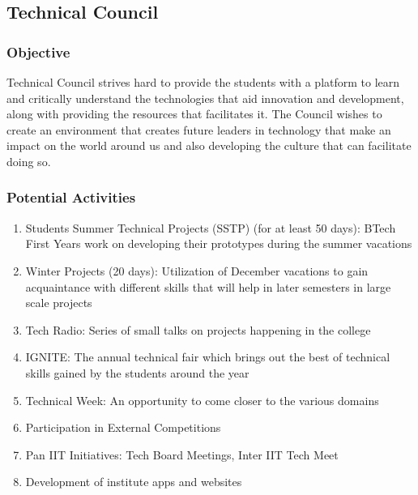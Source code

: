 \documentclass[12pt]{article}
\begin{document}
\newpage
\subsection{Technical Council}

\subsubsection{Objective}
Technical Council strives hard to provide the students with a platform to learn and critically understand the technologies that aid innovation and development, along with providing the resources that facilitates it. The Council wishes to create an environment that creates future leaders in technology that make an impact on the world around us and also developing the culture that can facilitate doing so.

\subsubsection{Potential Activities}
\begin{enumerate}
    \item Students Summer Technical Projects (SSTP) (for at least 50 days): BTech First Years work on developing their prototypes during the summer vacations
    \item Winter Projects (20 days): Utilization of December vacations to gain acquaintance with different skills that will help in later semesters in large scale projects
    \item Tech Radio: Series of small talks on projects happening in the college
    \item IGNITE: The annual technical fair which brings out the best of technical skills gained by the students around the year
    \item Technical Week: An opportunity to come closer to the various domains
    \item Participation in External Competitions
    \item Pan IIT Initiatives: Tech Board Meetings, Inter IIT Tech Meet
    \item Development of institute apps and websites
\end{enumerate}
\end{document}
